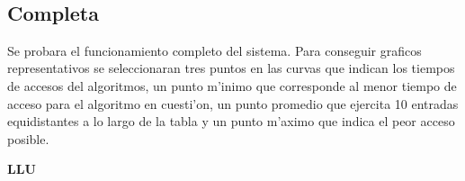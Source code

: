 \documentclass[12pt,spanish]{article}
\begin{document}
\\
\subsection*{Completa}

Se probara el funcionamiento completo del sistema. Para conseguir graficos representativos se seleccionaran tres puntos en las curvas que indican los 
tiempos de accesos del algoritmos, un punto m'inimo que corresponde al menor tiempo de acceso para el algoritmo en cuesti'on, 
un punto promedio que ejercita 10 entradas equidistantes a lo largo de la tabla y un punto m'aximo que indica el peor acceso posible. 


\textbf{LLU}


\begin{figure}[!h]
\end{figure}
\end{document}
